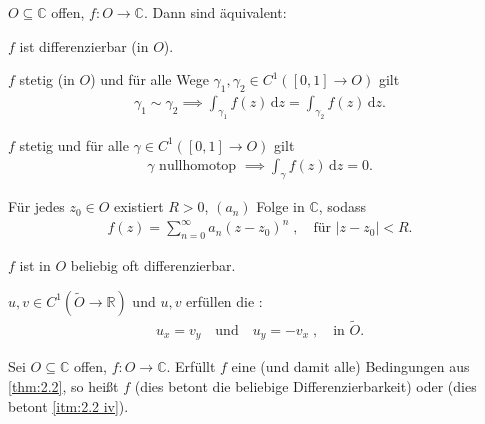\documentclass[a4paper,10pt]{scrbook}
\begin{document}
\begin{theorem}[Satz] \label{thm:2.2}
  $O \subseteq \mathbb{C}$ offen, $f : O \to \mathbb{C}$. Dann sind äquivalent:
  \begin{enum-roman}
    \item \label{itm:2.2 i} $f$ ist differenzierbar (in $O$).

    \item \label{itm:2.2 ii} $f$ stetig (in $O$) und für alle Wege $\gamma_1, \gamma_2 \in C^1([0,1] \to O)$ gilt
    \begin{align*}
      \gamma_1 \sim \gamma_2 \implies \int_{\gamma_1} f(z) \, \mathrm{d}z = \int_{\gamma_2} f(z) \, \mathrm{d}z.
    \end{align*}

    \item \label{itm:2.2 iii} $f$ stetig und für alle $\gamma \in C^1([0,1] \to O)$ gilt
    \begin{align*}
      \gamma \text{ nullhomotop } \implies \int_\gamma f(z) \, \mathrm{d}z = 0.
    \end{align*}

    \item \label{itm:2.2 iv} Für jedes $z_0 \in O$ existiert $R > 0$, $(a_n)$ Folge in $\mathbb{C}$, sodass
    \begin{align*}
      f(z) = \sum\limits_{n=0}^{\infty} a_n (z-z_0)^n \; , \quad \text{für } |z-z_0| < R.
    \end{align*}

    \item \label{itm:2.2 v} $f$ ist in $O$ beliebig oft differenzierbar.

    \item \label{itm:2.2 vi} $u, v \in C^1(\widetilde{O} \to \mathbb{R})$ und $u, v$ erfüllen die :
    \begin{align*}
      u_x = v_y \quad \text{und} \quad u_y = -v_x \; , \quad \text{in } \widetilde{O}.
    \end{align*}
  \end{enum-roman}
\end{theorem}

\begin{theorem}[Definition]
  Sei $O \subseteq \mathbb{C}$ offen, $f : O \to \mathbb{C}$. Erfüllt $f$ eine (und damit alle) Bedingungen aus \ref{thm:2.2}, so heißt $f$  (dies betont die beliebige Differenzierbarkeit) oder  (dies betont \ref{itm:2.2 iv}).
\end{theorem}
\end{document}

